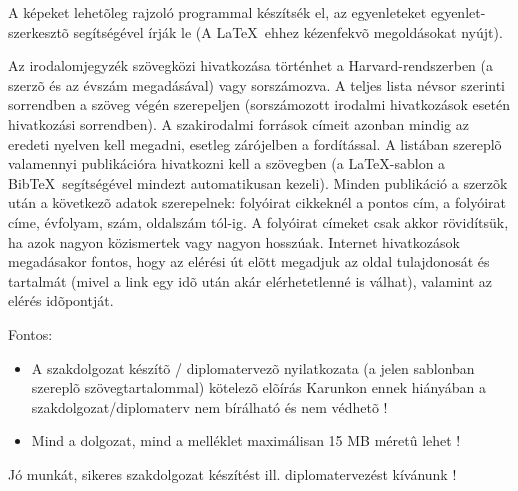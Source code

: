 A képeket lehetõleg rajzoló programmal készítsék el, az egyenleteket egyenlet-szerkesztõ segítségével írják le (A \LaTeX~ehhez kézenfekvõ megoldásokat nyújt).

Az irodalomjegyzék szövegközi hivatkozása történhet a Harvard-rendszerben (a szerzõ és az évszám megadásával) vagy sorszámozva. A teljes lista névsor szerinti sorrendben a szöveg végén szerepeljen (sorszámozott irodalmi hivatkozások esetén hivatkozási sorrendben). A szakirodalmi források címeit azonban mindig az eredeti nyelven kell megadni, esetleg zárójelben a fordítással. A listában szereplõ valamennyi publikációra hivatkozni kell a szövegben (a \LaTeX-sablon a Bib\TeX~segítségével mindezt automatikusan kezeli). Minden publikáció a szerzõk után a következõ adatok szerepelnek: folyóirat cikkeknél a pontos cím, a folyóirat címe, évfolyam, szám, oldalszám tól-ig. A folyóirat címeket csak akkor rövidítsük, ha azok nagyon közismertek vagy nagyon hosszúak. Internet hivatkozások megadásakor fontos, hogy az elérési út elõtt megadjuk az oldal tulajdonosát és tartalmát (mivel a link egy idõ után akár elérhetetlenné is válhat), valamint az elérés idõpontját.

\vspace{5mm}
Fontos:
\begin{itemize}
	\item A szakdolgozat készítõ / diplomatervezõ nyilatkozata (a jelen sablonban szereplõ szövegtartalommal) kötelezõ elõírás Karunkon ennek hiányában a szakdolgozat/diplomaterv nem bírálható és nem védhetõ !
	\item Mind a dolgozat, mind a melléklet maximálisan 15 MB méretû lehet !
\end{itemize}

\vspace{5mm}
\begin{center}
Jó munkát, sikeres szakdolgozat készítést ill. diplomatervezést kívánunk !
\end{center}

\normalsize
